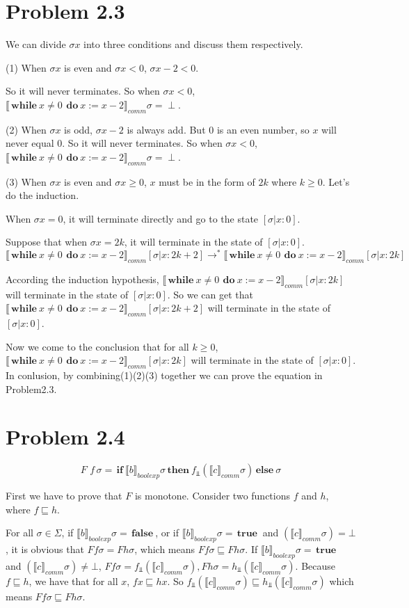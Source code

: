 \documentclass[a4papers]{ctexart}
\newcommand{\bif}{\,\boldsymbol{if}\ }
\newcommand{\belse}{\,\boldsymbol{else}\ }
\newcommand{\bthen}{\,\boldsymbol{then}\ }
\newcommand{\bwhile}{\,\boldsymbol{while}\ }
\newcommand{\bdo}{\,\boldsymbol{do}\ }
\newcommand{\btrue}{\,\boldsymbol{true}\ }
\newcommand{\bfalse}{\,\boldsymbol{false}\ }
\newcommand{\commBlock}[1]{\llbracket {#1} \rrbracket_{comm}}
\newcommand{\boolBlock}[1]{\llbracket {#1} \rrbracket_{boolexp}}
\begin{document}
\section{Problem 2.3}
We can divide $\sigma x$ into three conditions and discuss them respectively.

(1) When $\sigma x$ is even and $\sigma x < 0$, $\sigma x-2 <0$.

 So it will never terminates. So when $\sigma x < 0$,
$\commBlock{\bwhile x\ne 0\ \bdo x:=x-2 }\sigma=\perp$.

(2) When $\sigma x$ is odd, $\sigma x -2$ is always add. But 0 is an even number, so $x$ will never equal 0.
So it will never terminates. So when $\sigma x < 0$,
$\commBlock{\bwhile x\ne 0\ \bdo x:=x-2 }\sigma=\perp$.

(3) When $\sigma x$ is even and $\sigma x \ge 0$, $x$ must be in the form of $2k$ where $k\ge 0$.
Let's do the induction. 

When $\sigma x = 0$, it will terminate directly and go to the state $[\sigma|x:0]$.

Suppose that when $\sigma x = 2k$, it will terminate in the state of $[\sigma|x:0]$.
\[ \commBlock{\bwhile x\ne 0\ \bdo x:=x-2 }[\sigma|x:2k+2]\rightarrow^*
 \commBlock{\bwhile x\ne 0\ \bdo x:=x-2 }[\sigma|x:2k] \]

According the induction hypothesis, $\commBlock{\bwhile x\ne 0\ \bdo x:=x-2 }[\sigma|x:2k]$ will terminate in the state of $[\sigma|x:0]$.
So we can get that $\commBlock{\bwhile x\ne 0\ \bdo x:=x-2 }[\sigma|x:2k+2]$ will terminate in the state of $[\sigma|x:0]$.

Now we come to the conclusion that for all $k\ge 0$,
$\commBlock{\bwhile x\ne 0\ \bdo x:=x-2 }[\sigma|x:2k]$ will terminate in the state of $[\sigma|x:0]$.
\\

In conlusion, by combining(1)(2)(3) together we can prove the equation in Problem2.3.


\section{Problem 2.4}
\[ F \,\, f\,\sigma = \bif \boolBlock{b}\sigma \bthen f_{\Perp}(\commBlock{c}\sigma)  \belse \sigma \]

First we have to prove that $F$ is monotone. Consider two functions $f$ and $h$, where $f \sqsubseteq h$.

For all $\sigma \in \Sigma$, 
if $\boolBlock{b}\sigma = \bfalse$, or if $\boolBlock{b}\sigma = \btrue$ and $(\commBlock{c}\sigma) = \bot$,
it is obvious that $F f \sigma = F h \sigma$, which means $F f \sigma \sqsubseteq F h \sigma$.
If $\boolBlock{b}\sigma = \btrue$ and $(\commBlock{c}\sigma) \ne \bot$, $F f \sigma = f_{\Perp}(\commBlock{c}\sigma),F h\sigma = h_{\Perp}(\commBlock{c}\sigma) $. 
Because $f \sqsubseteq h$, we have that for all $x$, $fx \sqsubseteq hx$. So $f_{\Perp}(\commBlock{c}\sigma)  \sqsubseteq h_{\Perp}(\commBlock{c}\sigma)$ 
which means $F f \sigma \sqsubseteq F h \sigma$.
\end{document}

